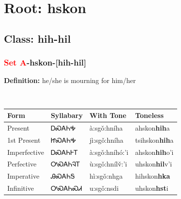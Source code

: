 \needspace{4in}
\section*{Root: hskon}
\nopagebreak
{}
\needspace{3in}
\subsection*{Class: hih-hil}
\nopagebreak
\needspace{2in}
\subsubsection*{\textcolor{Red}{Set A}{-}\textbf{hskon}{-}[hih-hil]}
\nopagebreak
\textbf{Definition: } he/she is mourning for him/her
\\[0.5em]
\begin{tabularx}{\textwidth}{l X X X}%
\toprule%
\textbf{Form}&\textbf{Syllabary}&\textbf{With Tone}&\textbf{Toneless}\\%
\midrule%
Present&ᎠᏍᎪᏂᎭ&à:sgǒ:hníha&ahskon\textbf{hih}a\\%
1st Present&ᏥᏍᎪᏂᎭ&jì:sgǒ:hníha&tsihskon\textbf{hih}a\\%
Imperfective&ᎠᏍᎪᏂᎰᎢ&à:sgǒ:hníhó:’i&ahskon\textbf{hih}o'i\\%
Perfective&ᎤᏍᎪᏂᎸᎢ&ù:sgǒ:hnílv̌:’i&uhskon\textbf{hil}v'i\\%
Imperative&ᎯᏍᎪᏂᎦ&hì:sgǒ:nhga&hihskon\textbf{hka}\\%
Infinitive&ᎤᏍᎪᏂᏍᏗ&u:sgǒ:nsdi&uhskon\textbf{hst}i\\%
\bottomrule%
\end{tabularx}
\\[1em]